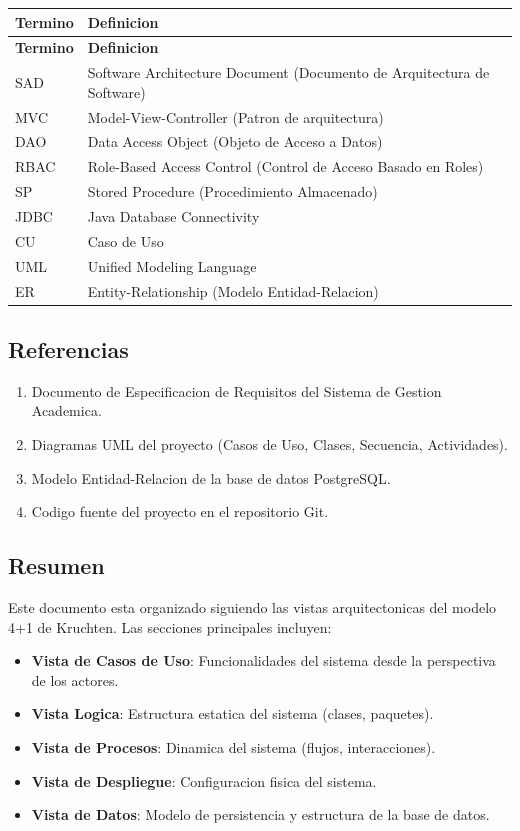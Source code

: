 \documentclass[12pt,a4paper]{article}
\begin{document}
\begin{longtable}{|p{4cm}|p{10cm}|}
\hline
\rowcolor{udgreen!20}
\textbf{Termino} & \textbf{Definicion} \\
\hline
\endfirsthead
\hline
\rowcolor{udgreen!20}
\textbf{Termino} & \textbf{Definicion} \\
\hline
\endhead
SAD & Software Architecture Document (Documento de Arquitectura de Software) \\
\hline
MVC & Model-View-Controller (Patron de arquitectura) \\
\hline
DAO & Data Access Object (Objeto de Acceso a Datos) \\
\hline
RBAC & Role-Based Access Control (Control de Acceso Basado en Roles) \\
\hline
SP & Stored Procedure (Procedimiento Almacenado) \\
\hline
JDBC & Java Database Connectivity \\
\hline
CU & Caso de Uso \\
\hline
UML & Unified Modeling Language \\
\hline
ER & Entity-Relationship (Modelo Entidad-Relacion) \\
\hline
\end{longtable}

\subsection{Referencias}

\begin{enumerate}
    \item Documento de Especificacion de Requisitos del Sistema de Gestion Academica.
    \item Diagramas UML del proyecto (Casos de Uso, Clases, Secuencia, Actividades).
    \item Modelo Entidad-Relacion de la base de datos PostgreSQL.
    \item Codigo fuente del proyecto en el repositorio Git.
\end{enumerate}

\subsection{Resumen}

Este documento esta organizado siguiendo las vistas arquitectonicas del modelo 4+1 de Kruchten. Las secciones principales incluyen:
\begin{itemize}
    \item \textbf{Vista de Casos de Uso}: Funcionalidades del sistema desde la perspectiva de los actores.
    \item \textbf{Vista Logica}: Estructura estatica del sistema (clases, paquetes).
    \item \textbf{Vista de Procesos}: Dinamica del sistema (flujos, interacciones).
    \item \textbf{Vista de Despliegue}: Configuracion fisica del sistema.
    \item \textbf{Vista de Datos}: Modelo de persistencia y estructura de la base de datos.
\end{itemize}
\end{document}
